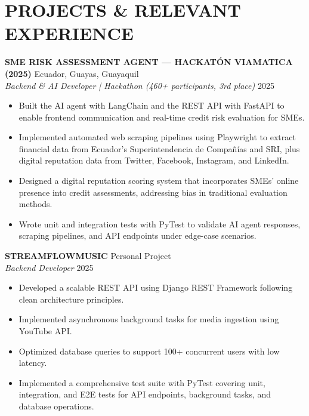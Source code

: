 \documentclass[11pt, a4paper]{article}
\begin{document}
\section*{PROJECTS \& RELEVANT EXPERIENCE}

\textbf{SME RISK ASSESSMENT AGENT --- HACKATÓN VIAMATICA (2025)} \hfill Ecuador, Guayas, Guayaquil \\
\textit{Backend \& AI Developer | Hackathon (460+ participants, 3rd place)} \hfill 2025

\begin{itemize}
\item Built the AI agent with LangChain and the REST API with FastAPI to enable frontend communication and real-time credit risk evaluation for SMEs.
\item Implemented automated web scraping pipelines using Playwright to extract financial data from Ecuador's Superintendencia de Compañías and SRI, plus digital reputation data from Twitter, Facebook, Instagram, and LinkedIn.
\item Designed a digital reputation scoring system that incorporates SMEs' online presence into credit assessments, addressing bias in traditional evaluation methods.
\item Wrote unit and integration tests with PyTest to validate AI agent responses, scraping pipelines, and API endpoints under edge-case scenarios.
\end{itemize}

\vspace{4pt}

\textbf{STREAMFLOWMUSIC} \hfill Personal Project \\
\textit{Backend Developer} \hfill 2025

\begin{itemize}
\item Developed a scalable REST API using Django REST Framework following clean architecture principles.
\item Implemented asynchronous background tasks for media ingestion using YouTube API.
\item Optimized database queries to support 100+ concurrent users with low latency.
\item Implemented a comprehensive test suite with PyTest covering unit, integration, and E2E tests for API endpoints, background tasks, and database operations.
\end{itemize}

\vspace{4pt}
\end{document}
